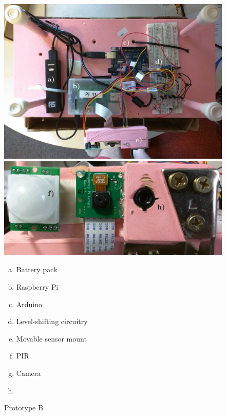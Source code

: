 \documentclass[../thesis/thesis.tex]{subfiles}
\begin{document}
\begin{figure}
\centering
\includegraphics[width=\textwidth]{../diagrams/prototypeb-1.jpg}
\includegraphics[width=\textwidth]{../diagrams/prototypeb-2.jpg}
{\small
\begin{multicols}{2}
\begin{enumerate}[a)]
 \item Battery pack
 \item Raspberry Pi
 \item Arduino
 \item Level-shifting circuitry
 \item Movable sensor mount
 \item PIR
 \item Camera
 \item \mlx
\end{enumerate}
\end{multicols}
}
\caption{Prototype B}
\label{fig:pictures:protob1}
\end{figure}
\end{document}
